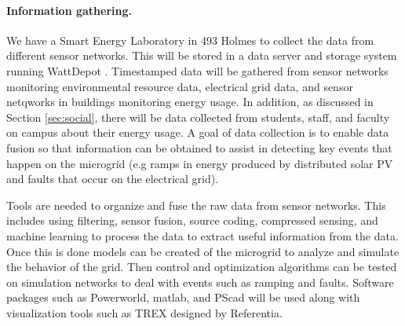 \paragraph{Information gathering.}

We have a Smart Energy Laboratory in 493 Holmes to collect the data from
different sensor networks.  This will be stored in a data server and
storage system running WattDepot \cite{csdl2-10-05}.  Timestamped data will
be gathered from sensor networks monitoring environmental resource data,
electrical grid data, and sensor netqworks in buildings monitoring energy
usage.  In addition, as discussed in Section \ref{sec:social}, there will
be data collected from students, staff, and faculty on campus about their
energy usage.  A goal of data collection is to enable data fusion so
that information can be obtained to assist in detecting key events that
happen on the microgrid (e.g ramps in energy produced by distributed solar
PV and faults that occur on the electrical grid).

Tools are needed to organize and fuse the raw data from sensor networks.
This includes using filtering, sensor fusion, source coding, compressed
sensing, and machine learning to process the data to extract useful
information from the data.  Once this is done models can be created of the
microgrid to analyze and simulate the behavior of the grid.  Then control
and optimization algorithms can be tested on simulation networks to deal
with events such as ramping and faults.  Software packages such as
Powerworld, matlab, and PScad will be used along with visualization tools
such as TREX designed by Referentia.


 



